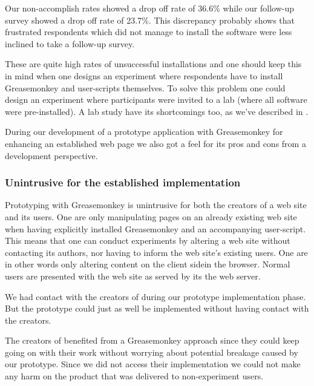 Our non-accomplish rates showed a drop off rate of 36.6\% while
our follow-up survey showed a drop off rate of 23.7\%.%
This discrepancy probably shows that
frustrated respondents which did not manage to install the software were less
inclined to take a follow-up survey.

These are quite high rates of unsuccessful
installations and one should keep this in mind when one designs an
experiment where respondents have to install Greasemonkey and user-scripts
themselves. To solve this problem one could design an experiment where
participants were invited to a lab (where all software were pre-installed). A
lab study have its shortcomings too, as we've described in
.

\parabreak

During our development of a prototype application with Greasemonkey for
enhancing an established web page we also got a feel for its pros and cons
from a development perspective.

\subsubsection{Unintrusive for the established implementation}

Prototyping with Greasemonkey is unintrusive for both the creators
of a web site and its users.  One are only manipulating
pages on an already existing web site when having explicitly installed
Greasemonkey and an accompanying user-script. This means that one can
conduct experiments by altering a web site without contacting its authors,
nor having to inform the web site's existing users. One are in other words
only altering content on the client side\dash{}in the browser. Normal users
are presented with the web site as served by its the web server.

We had contact with the creators of \urort{} during our prototype
implementation phase. But the prototype could just as well be implemented
without having contact with the creators.%

The creators of \urort{} benefited from a Greasemonkey approach since they
could keep going on with their work without worrying about potential breakage
caused by our prototype. Since we did not access their implementation we could
not make any harm on the product that was delivered to non-experiment users.

